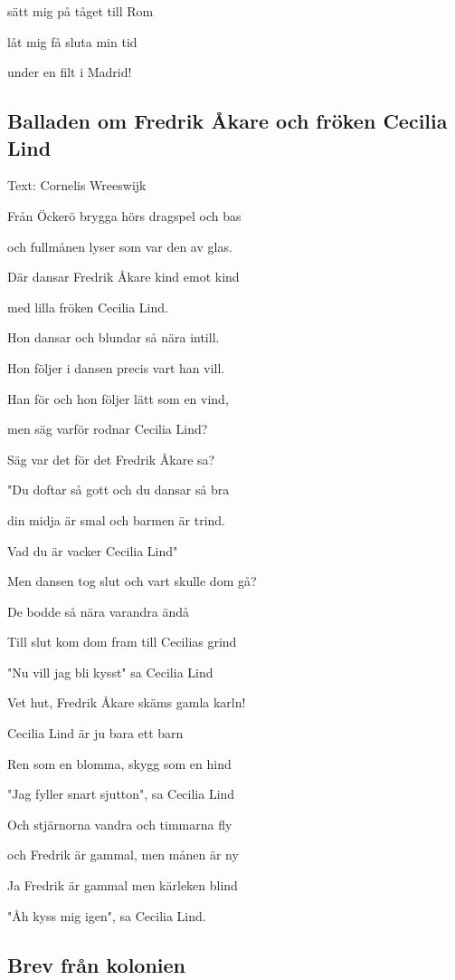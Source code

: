 sätt mig på tåget till Rom

låt mig få sluta min tid

under en filt i Madrid! \bigskip

\subsection{\textbf{Balladen om Fredrik Åkare och fröken Cecilia Lind}}

Text: Cornelis Wreeswijk \bigskip


Från Öckerö brygga hörs dragspel och bas

och fullmånen lyser som var den av glas.

Där dansar Fredrik Åkare kind emot kind

med lilla fröken Cecilia Lind.\bigskip


Hon dansar och blundar så nära intill.

Hon följer i dansen precis vart han vill.

Han för och hon följer lätt som en vind,

men säg varför rodnar Cecilia Lind?\bigskip


Säg var det för det Fredrik Åkare sa?

"Du doftar så gott och du dansar så bra

din midja är smal och barmen är trind.

Vad du är vacker Cecilia Lind"\bigskip


Men dansen tog slut och vart skulle dom gå?

De bodde så nära varandra ändå

Till slut kom dom fram till Cecilias grind

"Nu vill jag bli kysst" sa Cecilia Lind \bigskip


Vet hut, Fredrik Åkare skäms gamla karln!

Cecilia Lind är ju bara ett barn

Ren som en blomma, skygg som en hind

"Jag fyller snart sjutton", sa Cecilia Lind\bigskip


Och stjärnorna vandra och timmarna fly

och Fredrik är gammal, men månen är ny

Ja Fredrik är gammal men kärleken blind

"Åh kyss mig igen", sa Cecilia Lind.\bigskip

\subsection{\textbf{Brev från kolonien}}

